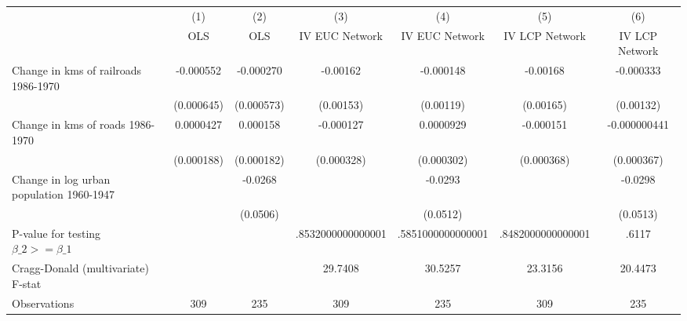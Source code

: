 {
\def\sym#1{\ifmmode^{#1}\else\(^{#1}\)\fi}
\begin{tabular}{l*{6}{c}}
\hline\hline
                &\multicolumn{1}{c}{(1)}&\multicolumn{1}{c}{(2)}&\multicolumn{1}{c}{(3)}&\multicolumn{1}{c}{(4)}&\multicolumn{1}{c}{(5)}&\multicolumn{1}{c}{(6)}\\
                &\multicolumn{1}{c}{OLS}&\multicolumn{1}{c}{OLS}&\multicolumn{1}{c}{IV EUC Network}&\multicolumn{1}{c}{IV EUC Network}&\multicolumn{1}{c}{IV LCP Network}&\multicolumn{1}{c}{IV LCP Network}\\
\hline
Change in kms of railroads 1986-1970&-0.000552         &-0.000270         & -0.00162         &-0.000148         & -0.00168         &-0.000333         \\
                &(0.000645)         &(0.000573)         &(0.00153)         &(0.00119)         &(0.00165)         &(0.00132)         \\
[1em]
Change in kms of roads 1986-1970&0.0000427         & 0.000158         &-0.000127         &0.0000929         &-0.000151         &-0.000000441         \\
                &(0.000188)         &(0.000182)         &(0.000328)         &(0.000302)         &(0.000368)         &(0.000367)         \\
[1em]
Change in log urban population 1960-1947&                  &  -0.0268         &                  &  -0.0293         &                  &  -0.0298         \\
                &                  & (0.0506)         &                  & (0.0512)         &                  & (0.0513)         \\
\hline
P-value for testing $\beta\_{2} >= \beta\_{1}$&                  &                  &.8532000000000001         &.5851000000000001         &.8482000000000001         &    .6117         \\
Cragg-Donald (multivariate) F-stat&                  &                  &  29.7408         &  30.5257         &  23.3156         &  20.4473         \\
Observations    &      309         &      235         &      309         &      235         &      309         &      235         \\
\hline\hline
\end{tabular}
}
